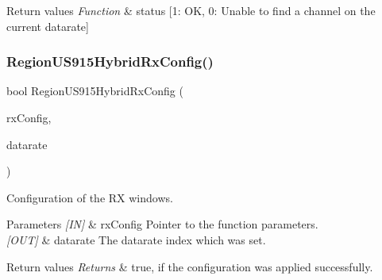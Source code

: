 \begin{DoxyRetVals}{Return values}
{\em Function} & status \mbox{[}1\+: OK, 0\+: Unable to find a channel on the current datarate\mbox{]} \\
\hline
\end{DoxyRetVals}
\mbox{\label{group__REGIONUS915HYB_ga0f982743b1649a9491067676307a2e75}} 
\subsubsection{\texorpdfstring{Region\+U\+S915\+Hybrid\+Rx\+Config()}{RegionUS915HybridRxConfig()}}
{\footnotesize\ttfamily bool Region\+U\+S915\+Hybrid\+Rx\+Config (\begin{DoxyParamCaption}\item[{\hyperlink{group__REGION_ga375c038078dfcfc7ef14280021db719e}{Rx\+Config\+Params\+\_\+t} $\ast$}]{rx\+Config,  }\item[{int8\+\_\+t $\ast$}]{datarate }\end{DoxyParamCaption})}



Configuration of the RX windows. 


\begin{DoxyParams}{Parameters}
{\em \mbox{[}\+I\+N\mbox{]}} & rx\+Config Pointer to the function parameters.\\
\hline
{\em \mbox{[}\+O\+U\+T\mbox{]}} & datarate The datarate index which was set.\\
\hline
\end{DoxyParams}

\begin{DoxyRetVals}{Return values}
{\em Returns} & true, if the configuration was applied successfully. \\
\hline
\end{DoxyRetVals}
\mbox{\label{group__REGIONUS915HYB_gaaee00f3fbfae1f41b0eec05d8b564177}} 
